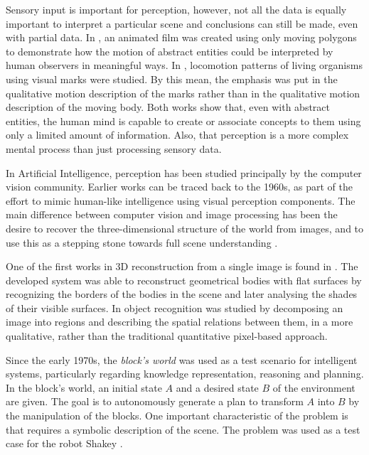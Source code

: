 
Sensory input is important for perception, however, not all the data is equally important to interpret a particular scene and conclusions can still be made, even with partial data.
In \citep{Heider1944_Experimental}, an animated film was created using only moving polygons to demonstrate how the motion of abstract entities could be interpreted by human observers in meaningful ways.
In \citep{Johansson1973_VisualPer}, locomotion patterns of living organisms using visual marks were studied. 
By this mean, the emphasis was put in the qualitative motion description of the marks rather than in the qualitative motion description of the moving body.
Both works show that, even with abstract entities, the human mind is capable to create or associate concepts to them using only a limited amount of information.
Also, that perception is a more complex mental process than just processing sensory data.

In Artificial Intelligence, perception has been studied principally by the computer vision community.
Earlier works can be traced back to the 1960s, as part of the effort to mimic human-like intelligence using visual perception components. The main difference between computer vision and image processing has been the desire to recover the three-dimensional structure of the world from images, and to use this as a stepping stone towards full scene understanding \citep{Winston1975_PsyCV}. 


One of the first works in 3D reconstruction from a single image is found in \citep{Roberts1963_PhDThesis}.
The developed system was able to reconstruct geometrical bodies with flat surfaces by recognizing the borders of the bodies in the scene and later analysing the shades of their visible surfaces.
In \citep{Barrow1971_RelatDesc} object recognition was studied by decomposing an image into regions and describing the spatial relations between them, in a more qualitative, rather than the traditional quantitative pixel-based approach.

Since the early 1970s, the \textit{block's world} was used as a test scenario for intelligent systems, particularly regarding knowledge representation, reasoning and planning.
In the block's world, an initial state $A$ and a desired state $B$  of the environment are given.
The goal is to autonomously generate a plan to transform $A$ into $B$ by the manipulation of the blocks.
One important characteristic of the problem is that requires a symbolic description of the scene.
The problem was used as a test case for the robot Shakey \citep{Nilsson84_Shakey}.

